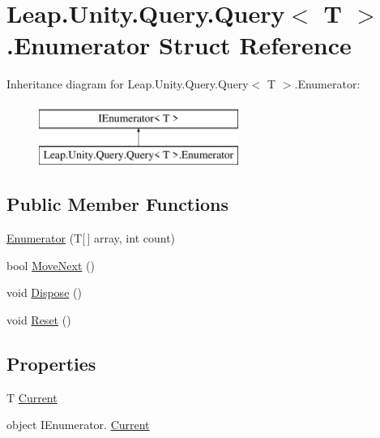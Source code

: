 \hypertarget{struct_leap_1_1_unity_1_1_query_1_1_query_1_1_enumerator}{}\section{Leap.\+Unity.\+Query.\+Query$<$ T $>$.Enumerator Struct Reference}
\label{struct_leap_1_1_unity_1_1_query_1_1_query_1_1_enumerator}
Inheritance diagram for Leap.\+Unity.\+Query.\+Query$<$ T $>$.Enumerator\+:\begin{figure}[H]
\begin{center}
\leavevmode
\includegraphics[height=2.000000cm]{struct_leap_1_1_unity_1_1_query_1_1_query_1_1_enumerator}
\end{center}
\end{figure}
\subsection*{Public Member Functions}
\begin{DoxyCompactItemize}
\item 
\mbox{\hyperlink{struct_leap_1_1_unity_1_1_query_1_1_query_1_1_enumerator_af3a50234f50d45d3e42c0d3963586a41}{Enumerator}} (T\mbox{[}$\,$\mbox{]} array, int count)
\item 
bool \mbox{\hyperlink{struct_leap_1_1_unity_1_1_query_1_1_query_1_1_enumerator_a37bb49da4458584db3d123073cd910df}{Move\+Next}} ()
\item 
void \mbox{\hyperlink{struct_leap_1_1_unity_1_1_query_1_1_query_1_1_enumerator_a484f305e44e8eb6174d2dd9d3c8a97e4}{Dispose}} ()
\item 
void \mbox{\hyperlink{struct_leap_1_1_unity_1_1_query_1_1_query_1_1_enumerator_abaeb7f38f97d51e247fb0e5baf3b2964}{Reset}} ()
\end{DoxyCompactItemize}
\subsection*{Properties}
\begin{DoxyCompactItemize}
\item 
T \mbox{\hyperlink{struct_leap_1_1_unity_1_1_query_1_1_query_1_1_enumerator_a6feb268d2a5f9856c0305eace9bb7c23}{Current}}
\item 
object I\+Enumerator. \mbox{\hyperlink{struct_leap_1_1_unity_1_1_query_1_1_query_1_1_enumerator_a47cac3a6e8199ed509d811a3a6322441}{Current}}
\end{DoxyCompactItemize}


